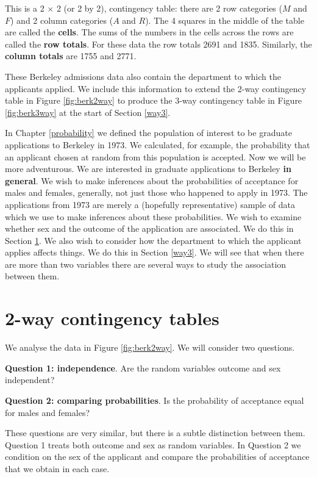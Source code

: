 \documentclass[
  british,
  11pt,
  openany, a4paper]{book}
\begin{document}
This is a 2 \(\times\) 2 (or 2 by 2), contingency table: there are 2 row categories (\(M\) and \(F\)) and 2 column categories (\(A\) and \(R\)). The 4 squares in the middle of the table are called the \textbf{cells}. The sums of the numbers in the cells across the rows are called the \textbf{row totals}. For these data the row totals 2691 and 1835. Similarly, the \textbf{column totals} are 1755 and 2771.

These Berkeley admissions data also contain the department to which the applicants applied. We include this information to extend the 2-way contingency table in Figure \ref{fig:berk2way} to produce the 3-way contingency table in Figure \ref{fig:berk3way} at the start of Section \ref{way3}.

In Chapter \ref{probability} we defined the population of interest to be graduate applications to Berkeley in 1973. We calculated, for example, the probability that an applicant chosen at random from this population is accepted. Now we will be more adventurous. We are interested in graduate applications to Berkeley \textbf{in general}. We wish to make inferences about the probabilities of acceptance for males and females, generally, not just those who happened to apply in 1973. The applications from 1973 are merely a (hopefully representative) sample of data which we use to make inferences about these probabilities. We wish to examine whether sex and the outcome of the application are associated. We do this in Section \ref{way2}. We also wish to consider how the department to which the applicant applies affects things. We do this in Section \ref{way3}. We will see that when there are more than two variables there are several ways to study the association between them.

\section{2-way contingency tables}\label{way2}

We analyse the data in Figure \ref{fig:berk2way}. We will consider two questions.

\textbf{Question 1: independence}. Are the random variables outcome and sex independent?

\textbf{Question 2: comparing probabilities}. Is the probability of acceptance equal for males and females?

These questions are very similar, but there is a subtle distinction between them. Question 1 treats both outcome and sex as random variables. In Question 2 we condition on the sex of the applicant and compare the probabilities of acceptance that we obtain in each case.
\end{document}
